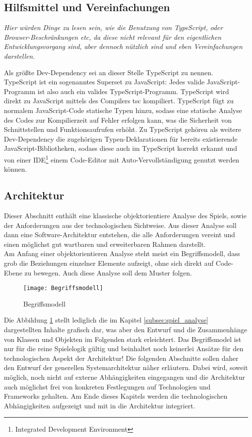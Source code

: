 \subsection{Hilfsmittel und Vereinfachungen}
\label{subsec:Hilfsmittel}

\emph{Hier würden Dinge zu lesen sein, wie die Benutzung von TypeScript, oder Browser-Beschränkungen etc, da diese nicht relevant für den eigentlichen Entwicklungsvorgang sind, aber dennoch nützlich sind und eben Vereinfachungen darstellen.}

Als größte Dev-Dependency sei an dieser Stelle TypeScript zu nennen. TypeScript ist ein sogenanntes Superset zu JavaScript: Jedes valide JavaScript-Programm ist also auch ein valides TypeScript-Programm. TypeScript wird direkt zu JavaScript mittels des Compilers tsc kompiliert. TypeScript fügt zu normalem JavaScript-Code statische Typen hinzu, sodass eine statische Analyse des Codes zur Kompilierzeit auf Fehler erfolgen kann, was die Sicherheit von Schnittstellen und Funktionsaufrufen erhöht. Zu TypeScript gehören als weitere Dev-Dependency die zugehörigen Typen-Deklarationen für bereits existierende JavaScript-Bibliotheken, sodass diese auch im TypeScript korrekt erkannt und von einer IDE\footnote{Integrated Development Environment} \bzw einem Code-Editor mit Auto-Vervollständigung genutzt werden können.

\subsection{Architektur}
\label{subsec:Architektur}
Dieser Abschnitt enthält eine klassische objektorientiere Analyse des Spiels, sowie der Anforderungen aus der technologischen Sichtweise. Aus dieser Analyse soll dann eine Software-Architektur entstehen, die alle Anforderungen vereint und einen möglichst gut wartbaren und erweiterbaren Rahmen darstellt.\\
Am Anfang einer objektorientieren Analyse steht meist ein Begriffsmodell, dass grob die Beziehungen einzelner Elemente aufzeigt, ohne sich direkt auf Code-Ebene zu bewegen. Auch diese Analyse soll dem Muster folgen. 
\begin{figure}[h]
	\centering
	\captionsetup{justification=centering}
	\texttt{[image: Begriffsmodell]}
	\caption[Begriffsmodell]{Begriffsmodell}
	\label{fig:Begriffsmodell}
\end{figure}
Die Abbildung \ref{fig:Begriffsmodell} stellt lediglich die im Kapitel \ref{subsec:spiel_analyse} dargestellten Inhalte grafisch dar, was aber den Entwurf und die Zusammenhänge von Klassen und Objekten im Folgenden stark erleichtert. Das Begriffsmodel ist nur für die reine Spielelogik gültig und beinhaltet noch keinerlei Ansätze für den technologischen Aspekt der Architektur! Die folgenden Abschnitte sollen daher den Entwurf der generellen Systemarchitektur näher erläutern. Dabei wird, soweit möglich, noch nicht auf externe Abhängigkeiten eingegangen und die Architektur auch möglichst frei von konkreten Festlegungen auf Technologien und Frameworks gehalten. Am Ende dieses Kapitels werden die technologischen Abhängigkeiten aufgezeigt und mit in die Architektur integriert.

